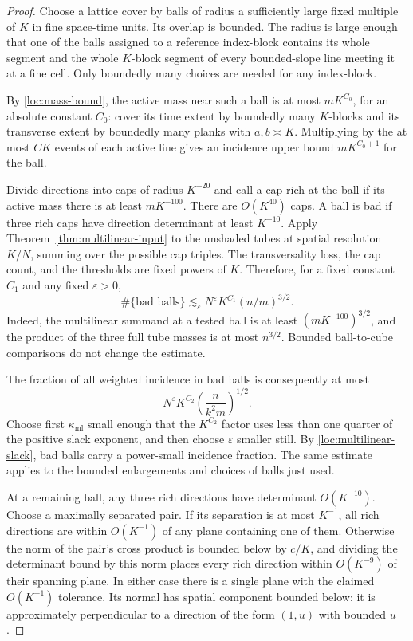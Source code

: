 \begin{proof}
Choose a lattice cover by balls of radius a sufficiently large fixed
multiple of $K$ in fine space-time units.  Its overlap is bounded.
The radius is large enough that one of the balls assigned to a
reference index-block contains its whole segment and the whole
$K$-block segment of every bounded-slope line meeting it at a fine
cell.  Only boundedly many choices are needed for any index-block.

By \eqref{loc:mass-bound}, the active mass near such a ball is at
most $mK^{C_0}$, for an absolute constant $C_0$: cover its time
extent by boundedly many $K$-blocks and its transverse extent by
boundedly many planks with $a,b\asymp K$.  Multiplying by the at
most $CK$ events of each active line gives an incidence upper bound
$mK^{C_0+1}$ for the ball.

Divide directions into caps of radius $K^{-20}$ and call a cap rich
at the ball if its active mass there is at least $mK^{-100}$.
There are $O(K^{40})$ caps.  A ball is bad if three rich caps have
direction determinant at least $K^{-10}$.  Apply
Theorem~\ref{thm:multilinear-input} to the unshaded tubes at spatial
resolution $K/N$, summing over the possible cap triples.  The
transversality loss, the cap count, and the thresholds are fixed
powers of $K$.  Therefore, for a fixed constant $C_1$ and any fixed
$\varepsilon>0$,
\begin{equation}
 \#\{\text{bad balls}\}
 \lesssim_\varepsilon N^\varepsilon K^{C_1}(n/m)^{3/2}.
 \label{loc:bad-balls}
\end{equation}
Indeed, the multilinear summand at a tested ball is at least
$(mK^{-100})^{3/2}$, and the product of the three full tube masses
is at most $n^{3/2}$.  Bounded ball-to-cube comparisons do not change
the estimate.

The fraction of all weighted incidence in bad balls is consequently
at most
\[
 N^\varepsilon K^{C_2}
       \left(\frac{n}{k^2m}\right)^{1/2}.
\]
Choose first $\kappa_{\mathrm{ml}}$ small enough that the $K^{C_2}$
factor uses less than one quarter of the positive slack exponent,
and then choose $\varepsilon$ smaller still.  By
\eqref{loc:multilinear-slack}, bad balls carry a power-small
incidence fraction.  The same estimate applies to the bounded
enlargements and choices of balls just used.

At a remaining ball, any three rich directions have determinant
$O(K^{-10})$.  Choose a maximally separated pair.  If its separation
is at most $K^{-1}$, all rich directions are within $O(K^{-1})$ of
any plane containing one of them.  Otherwise the norm of the pair's
cross product is bounded below by $c/K$, and dividing the determinant
bound by this norm places every rich direction within $O(K^{-9})$
of their spanning plane.  In either case there is a single plane
with the claimed $O(K^{-1})$ tolerance.  Its normal has spatial
component bounded below: it is approximately perpendicular to a
direction of the form $(1,u)$ with bounded $u$.


\end{proof}
